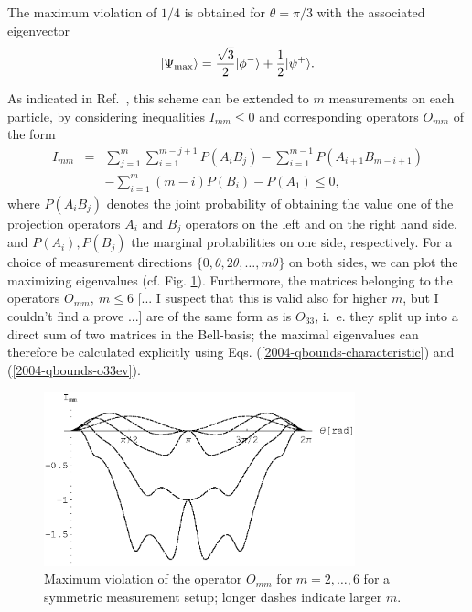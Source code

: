 \documentclass[prl,showpacs,showkeys,amsfonts,amsmath,twocolumn]{revtex4}
\newcommand{\ket}[1]{|#1\rangle}
\begin{document}
The maximum violation of $1/4$ is obtained for $\theta=\pi/3$ with the associated
eigenvector
\begin{equation}
  \ket{\Psi_{\rm max}}=\frac{\sqrt{3}}{2}\ket{\phi^-}+\frac{1}{2}\ket{\psi^+}.
\label{2004-qbounds-pmax33}
\end{equation}


As indicated in Ref.~\cite{collins-gisin-2003}, this scheme can be extended to $m$
measurements on each particle, by considering inequalities $I_{mm}
\leq 0$ and
corresponding operators $O_{mm}$ of the form
\begin{eqnarray}
  I_{mm}&=& \sum_{j=1}^{m}\sum_{i=1}^{m-j+1}P({A_i B_j})-\sum_{i=1}^{m-1}
  P({A_{i+1}B_{m-i+1}}) \nonumber\\
  &&-\sum_{i=1}^{m}(m-i)P(B_{i}) - P(A_1) \leq 0,
\end{eqnarray}
where $P(A_i B_j)$ denotes the joint probability of obtaining the value one of the
projection operators $A_i$ and $B_j$ operators on the left and on the
right hand side, and $P(A_i), P(B_j)$ the marginal probabilities on
one side, respectively.
For a choice of measurement directions
$\{0,\theta,2\theta,\ldots,m\theta\}$ on both sides, we can plot the
maximizing eigenvalues
(cf. Fig. \ref{fig:2004-qbounds-f2}). Furthermore, the matrices belonging to the operators $O_{mm},\ m \leq
6$ [... I suspect that this is valid also for higher $m$, but I
couldn't find a prove ...] are of the same form
as is $O_{33}$, i.~e. they
split up into a direct sum of two matrices in the
Bell-basis; the maximal eigenvalues can therefore be  calculated
explicitly using Eqs. (\ref{2004-qbounds-characteristic}) and (\ref{2004-qbounds-o33ev}).
\begin{figure}[htbp]
  \centering
  \includegraphics[width=90mm]{2004-qbounds-f2}
  \caption{Maximum violation of the operator $O_{mm}$ for
    $m=2,\ldots,6$ for a symmetric measurement setup; longer dashes indicate larger $m$.}
  \label{fig:2004-qbounds-f2}
\end{figure}
\end{document}
